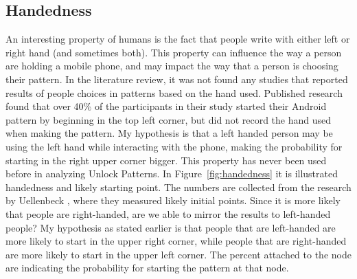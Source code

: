       \subsection*{Handedness}
      An interesting property of humans is the fact that people write with either left or right hand (and sometimes both). This property can influence the way a person are holding a mobile phone, and may impact the way that a person is choosing their pattern. In the literature review, it was not found any studies that reported results of people choices in patterns based on the hand used. Published research \cite{Uellenbeck} found that over 40\% of the participants in their study started their Android pattern by beginning in the top left corner, but did not record the hand used when making the pattern. My hypothesis is that a left handed person may be using the left hand while interacting with the phone, making the probability for starting in the right upper corner bigger. This property has never been used before in analyzing Unlock Patterns. In Figure~\ref{fig:handedness} it is illustrated handedness and likely starting point. The numbers are collected from the research by Uellenbeck \cite{Uellenbeck}, where they measured likely initial points. Since it is more likely that people are right-handed, are we able to mirror the results to left-handed people? My hypothesis as stated earlier is that people that are left-handed are more likely to start in the upper right corner, while people that are right-handed are more likely to start in the upper left corner. The percent attached to the node are indicating the probability for starting the pattern at that node. 

